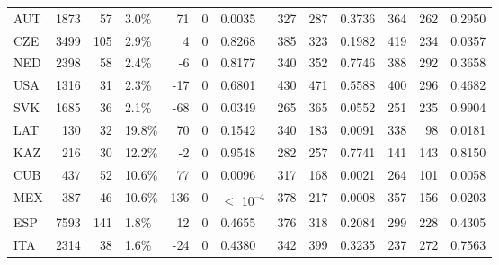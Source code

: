\begin{tabular}[t]{lrrlrrlrrlrrl}
AUT & 1873 & 57 & 3.0\% & 71 & 0 & 0.0035 & 327 & 287 & 0.3736 & 364 & 262 & 0.2950\\
CZE & 3499 & 105 & 2.9\% & 4 & 0 & 0.8268 & 385 & 323 & 0.1982 & 419 & 234 & 0.0357\\
NED & 2398 & 58 & 2.4\% & -6 & 0 & 0.8177 & 340 & 352 & 0.7746 & 388 & 292 & 0.3658\\
USA & 1316 & 31 & 2.3\% & -17 & 0 & 0.6801 & 430 & 471 & 0.5588 & 400 & 296 & 0.4682\\
SVK & 1685 & 36 & 2.1\% & -68 & 0 & 0.0349 & 265 & 365 & 0.0552 & 251 & 235 & 0.9904\\
LAT & 130 & 32 & 19.8\% & 70 & 0 & 0.1542 & 340 & 183 & 0.0091 & 338 & 98 & 0.0181\\
KAZ & 216 & 30 & 12.2\% & -2 & 0 & 0.9548 & 282 & 257 & 0.7741 & 141 & 143 & 0.8150\\
CUB & 437 & 52 & 10.6\% & 77 & 0 & 0.0096 & 317 & 168 & 0.0021 & 264 & 101 & 0.0058\\
MEX & 387 & 46 & 10.6\% & 136 & 0 & $<$ 10\textsuperscript{--4} & 378 & 217 & 0.0008 & 357 & 156 & 0.0203\\
ESP & 7593 & 141 & 1.8\% & 12 & 0 & 0.4655 & 376 & 318 & 0.2084 & 299 & 228 & 0.4305\\
ITA & 2314 & 38 & 1.6\% & -24 & 0 & 0.4380 & 342 & 399 & 0.3235 & 237 & 272 & 0.7563\\
\bottomrule
\end{tabular}
